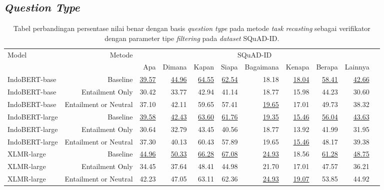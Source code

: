 \subsection*{\emph{Question Type}}
\begin{table}[H]\centering
\scriptsize
\begin{tabular}{lrrrrrrrrrr}\toprule
\multirow{2}{*}{Model} &\multirow{2}{*}{Metode} &\multicolumn{8}{c}{SQuAD-ID} \\\cmidrule{3-10}
& &Apa &Dimana &Kapan &Siapa &Bagaimana &Kenapa &Berapa &Lainnya \\\midrule
IndoBERT-base &Baseline &\underline{39.57} &\underline{44.96} &\underline{64.55} &\underline{62.54} &18.18 &\underline{18.04} &\underline{58.41} &\underline{42.66} \\
IndoBERT-base &Entailment Only &30.42 &33.77 &42.94 &41.14 &18.77 &15.98 &44.23 &30.60 \\
IndoBERT-base &Entailment or Neutral &37.10 &42.11 &59.65 &57.41 &\underline{19.65} &17.01 &49.73 &38.32 \\
\hline
IndoBERT-large &Baseline &\underline{39.58} &\underline{42.43} &\underline{63.60} &\underline{61.76} &\underline{19.35} &\underline{15.46} &\underline{56.04} &\underline{43.63} \\
IndoBERT-large &Entailment Only &30.64 &32.79 &43.45 &40.56 &18.77 &13.92 &41.99 &31.95 \\
IndoBERT-large &Entailment or Neutral &37.30 &40.13 &60.43 &57.89 &19.65 &\underline{15.46} &48.17 &39.38 \\
\hline
XLMR-large &Baseline &\underline{44.96} &\underline{50.33} &\underline{66.28} &\underline{67.08} &\underline{24.93} &18.56 &\underline{61.28} &\underline{48.75} \\
\hline
XLMR-large &Entailment Only &34.45 &37.64 &48.41 &44.98 &21.70 &17.01 &47.57 &36.21 \\
XLMR-large &Entailment or Neutral &42.23 &47.05 &63.11 &62.36 &\underline{24.93} &\underline{19.07} &53.85 &44.92 \\
\bottomrule
\end{tabular}
\caption{Tabel perbandingan persentase nilai benar dengan basis \emph{question type} pada metode \emph{task recasting} sebagai verifikator dengan parameter tipe \emph{filtering} pada \emph{dataset} SQuAD-ID.}
\end{table}

